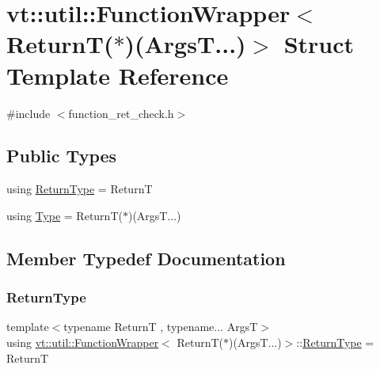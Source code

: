 \hypertarget{structvt_1_1util_1_1_function_wrapper_3_01_return_t_07_5_08_07_args_t_8_8_8_08_4}{}\section{vt\+:\+:util\+:\+:Function\+Wrapper$<$ ReturnT($\ast$)(ArgsT...)$>$ Struct Template Reference}
\label{structvt_1_1util_1_1_function_wrapper_3_01_return_t_07_5_08_07_args_t_8_8_8_08_4}


{\ttfamily \#include $<$function\+\_\+ret\+\_\+check.\+h$>$}

\subsection*{Public Types}
\begin{DoxyCompactItemize}
\item 
using \hyperlink{structvt_1_1util_1_1_function_wrapper_3_01_return_t_07_5_08_07_args_t_8_8_8_08_4_aa6d11252dc85a9f0ed82c9af6a95bda7}{Return\+Type} = ReturnT
\item 
using \hyperlink{structvt_1_1util_1_1_function_wrapper_3_01_return_t_07_5_08_07_args_t_8_8_8_08_4_a951becf6529bc9d27c0f4d46a09c59be}{Type} = ReturnT($\ast$)(Args\+T...)
\end{DoxyCompactItemize}


\subsection{Member Typedef Documentation}
\mbox{\label{structvt_1_1util_1_1_function_wrapper_3_01_return_t_07_5_08_07_args_t_8_8_8_08_4_aa6d11252dc85a9f0ed82c9af6a95bda7}} 
\subsubsection{\texorpdfstring{Return\+Type}{ReturnType}}
{\footnotesize\ttfamily template$<$typename ReturnT , typename... ArgsT$>$ \\
using \hyperlink{structvt_1_1util_1_1_function_wrapper}{vt\+::util\+::\+Function\+Wrapper}$<$ ReturnT($\ast$)(Args\+T...)$>$\+::\hyperlink{structvt_1_1util_1_1_function_wrapper_3_01_return_t_07_5_08_07_args_t_8_8_8_08_4_aa6d11252dc85a9f0ed82c9af6a95bda7}{Return\+Type} =  ReturnT}

